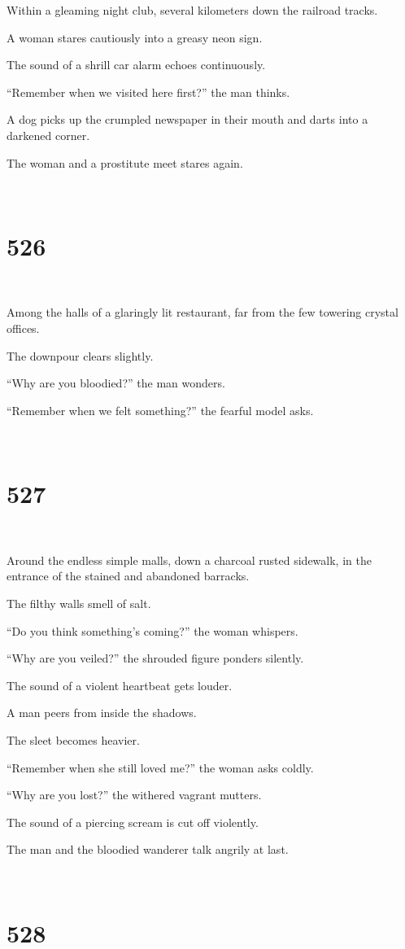 \documentclass{report}
\begin{document}
Within a gleaming night club, several kilometers down the railroad tracks.

A woman stares cautiously into a greasy neon sign.

The sound of a shrill car alarm echoes continuously.

``Remember when we visited here first?'' the man thinks.

A dog picks up the crumpled newspaper in their mouth and darts into a darkened corner.

The woman and a prostitute meet stares again.

~
\chapter*{526}
~

Among the halls of a glaringly lit restaurant, far from the few towering crystal offices.

The downpour clears slightly.

``Why are you bloodied?'' the man wonders.

``Remember when we felt something?'' the fearful model asks.

~
\chapter*{527}
~

Around the endless simple malls, down a charcoal rusted sidewalk, in the entrance of the stained and abandoned barracks.

The filthy walls smell of salt.

``Do you think something's coming?'' the woman whispers.

``Why are you veiled?'' the shrouded figure ponders silently.

The sound of a violent heartbeat gets louder.

A man peers from inside the shadows.

The sleet becomes heavier.

``Remember when she still loved me?'' the woman asks coldly.

``Why are you lost?'' the withered vagrant mutters.

The sound of a piercing scream is cut off violently.

The man and the bloodied wanderer talk angrily at last.

~
\chapter*{528}
~
\end{document}
